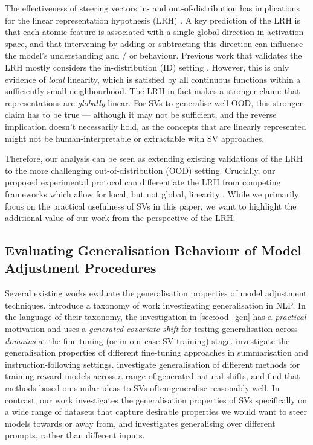 \documentclass{article}
\begin{document}
The effectiveness of steering vectors in- and out-of-distribution has implications for the linear representation hypothesis (LRH) \citep{parkLinearRepresentationHypothesis2023}. A key prediction of the LRH is that each atomic feature is associated with a single global direction in activation space, and that intervening by adding or subtracting this direction can influence the model's understanding and / or behaviour. Previous work that validates the LRH mostly considers the in-distribution (ID) setting \citep{mallenElicitingLatentKnowledge2023,burnsDiscoveringLatentKnowledge2022,marksGeometryTruthEmergent2023, nandaEmergentLinearRepresentations2023,liEmergentWorldRepresentations2023}. However, this is only evidence of \textit{local} linearity, which is satisfied by all continuous functions within a sufficiently small neighbourhood. The LRH in fact makes a stronger claim: that representations are \textit{globally} linear. For SVs to generalise well OOD, this stronger claim has to be true --- although it may not be sufficient, and the reverse implication doesn't necessarily hold, as the concepts that are linearly represented might not be human-interpretable or extractable with SV approaches.

Therefore, our analysis can be seen as extending existing validations of the LRH to the more challenging out-of-distribution (OOD) setting. Crucially, our proposed experimental protocol can differentiate the LRH from competing frameworks which allow for local, but not global, linearity \citep{elhageToyModelsSuperposition2022,blackInterpretingNeuralNetworks2022}. While we primarily focus on the practical usefulness of SVs in this paper, we want to highlight the additional value of our work from the perspective of the LRH.

\subsection{Evaluating Generalisation Behaviour of Model Adjustment Procedures}
Several existing works evaluate the generalisation properties of model adjustment techniques. \citet{hupkesTaxonomyReviewGeneralization2023} introduce a taxonomy of work investigating generalisation in NLP. In the language of their taxonomy, the investigation in \cref{sec:ood_gen} has a \emph{practical} motivation and uses a \emph{generated covariate shift} for testing generalisation across \emph{domains} at the fine-tuning (or in our case SV-training) stage. \citet{kirkUnderstandingEffectsRLHF2024} investigate the generalisation properties of different fine-tuning approaches in summarisation and instruction-following settings. \citet{clymerGeneralizationAnalogiesTestbed2023} investigate generalisation of different methods for training reward models across a range of generated natural shifts, and find that methods based on similar ideas to SVs often generalise reasonably well. In contrast, our work investigates the generalisation properties of SVs specifically on a wide range of datasets that capture desirable properties we would want to steer models towards or away from, and investigates generalising over different prompts, rather than different inputs.
\end{document}
